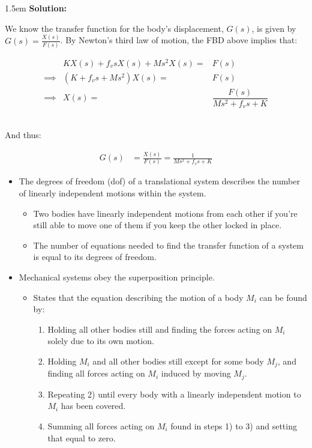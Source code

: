\documentclass{article}
\newenvironment{solution}{
	\vspace{.5em}
	\par
	\begin{adjustwidth}{1.5em}{}
	\textbf{{Solution:}}
	\par
	\vspace{.5em}
}{
	\vspace{1em}
	\end{adjustwidth}
}
\newcounter{step}
\begin{document}
\begin{solution}
	\vspace{1em}

	We know the transfer function for the body's displacement, $G(s)$, is given by $G(s) = \frac{X(s)}{F(s)}$. By Newton's third law of motion, the FBD above implies that:

	\begin{equation*}
		\begin{array}{lrl}
			& KX(s) + f_v s X(s) + Ms^2 X(s) =& F(s) \\
			\implies & (K + f_v s + Ms^2)X(s) =& F(s) \\
			\implies & X(s) =& \dfrac{F(s)}{Ms^2 + f_v s + K} \\\\
		\end{array}
	\end{equation*} \\

	And thus:

	\begin{align*}
		G(s) &= \frac{X(s)}{F(s)} = \frac{1}{Ms^2 + f_v s + K}
	\end{align*}
\end{solution}

\begin{itemize}
	\item The degrees of freedom (dof) of a translational system describes the number of linearly independent motions within the system.
	\begin{itemize}
		\item Two bodies have linearly independent motions from each other if you're still able to move one of them if you keep the other locked in place.
		\item The number of equations needed to find the transfer function of a system is equal to its degrees of freedom.
	\end{itemize}
	\item Mechanical systems obey the superposition principle.
	\begin{itemize}
		\item States that the equation describing the motion of a body $M_i$ can be found by:
		\begin{enumerate}
			\item Holding all other bodies still and finding the forces acting on $M_i$ solely due to its own motion.
			\item Holding $M_i$ and all other bodies still except for some body $M_j$, and finding all forces acting on $M_i$ induced by moving $M_j$.
			\item Repeating 2) until every body with a linearly independent motion to $M_i$ has been covered.
			\item Summing all forces acting on $M_i$ found in steps 1) to 3) and setting that equal to zero.
		\end{enumerate}
	\end{itemize}
\end{itemize}

\ifdefined\iscombined
	\newpage
\else
	
\end{document}
